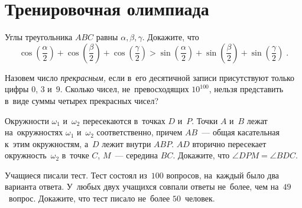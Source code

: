 
\section*{Тренировочная олимпиада}


\begin{problems}

\item
Углы треугольника $ABC$ равны $\alpha, \beta, \gamma$.
Докажите, что
\[
    \cos\left( \frac{\alpha}{2} \right) +
    \cos\left( \frac{\beta }{2} \right) +
    \cos\left( \frac{\gamma}{2} \right)
>
    \sin\left( \frac{\alpha}{2} \right) +
    \sin\left( \frac{\beta }{2} \right) +
    \sin\left( \frac{\gamma}{2} \right)
\; . \]

\item
Назовем число \emph{прекрасным,} если в~его десятичной записи присутствуют
только цифры $0$, $3$ и~$9$.
Сколько чисел, не~превосходящих $10^{100}$, нельзя представить в~виде суммы
четырех прекрасных чисел?

\item
Окружности $\omega_1$ и~$\omega_2$ пересекаются в~точках $D$ и~$P$.
Точки $A$ и~$B$ лежат на~окружностях $\omega_1$ и~$\omega_2$ соответственно,
причем $AB$~— общая касательная к~этим окружностям, а~$D$ лежит внутри $ABP$.
$AD$ вторично пересекает окружность~$\omega_2$ в~точке $C$,
$M$~--- середина $BC$.
Докажите, что $\angle DPM = \angle BDC$.

\item
Учащиеся писали тест.
Тест состоял из~$100$ вопросов, на~каждый было два варианта ответа.
У~любых двух учащихся совпали ответы не~более, чем на~$49$~вопрос.
Докажите, что тест писало не~более $50$~человек.

\end{problems}

